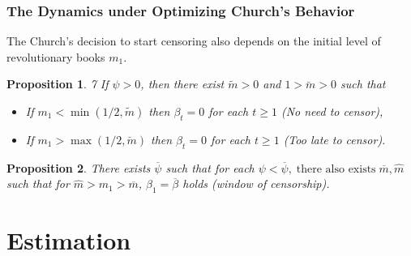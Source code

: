 \documentclass[usepdftitle=false,aspectratio=169,xcolor=dvipsnames]{beamer}
\newtheorem{proposition}{Proposition}
\begin{document}
	\begin{frame}
\frametitle{The Dynamics  under  Optimizing Church's Behavior}

The Church's decision to start censoring also depends on the initial level of revolutionary books $m_{1}$.

\begin{proposition}7
\label{proposition:tooLate}
If $\psi>0$, then there exist $\tilde{m}>0$ and $1>\breve{m}>0$ such that
\begin{itemize}
\item[i)] If $m_1<\min(1/2,\tilde{m})$ then $\beta_t=0$ for each $t\geq1$ (No need to censor),
\item[ii)] If $m_1>\max(1/2,\breve{m})$ then $\beta_t=0$ for each $t\geq1$ (Too late to censor).
\end{itemize}
\end{proposition}


\begin{proposition}
\label{proposition:window}
There exists $\overline{\psi}$ such that for each $\psi<\overline{\psi},\;\text{there also exists} \;\overline{m},\hat{m}$ such that for $\hat{m}>m_{1}>\overline{m}$, $\beta_1=\overline{\beta}$ holds (window of censorship).
\end{proposition}


\end{frame}


	\section{Estimation}
	\subsection{}
\end{document}
